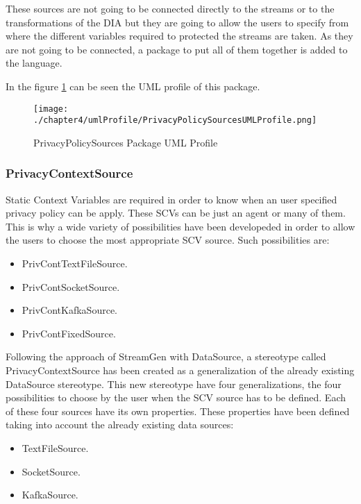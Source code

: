 These sources are not going to be connected directly to the streams or to the transformations of the DIA but they are going to allow the users to specify from where the different variables required to protected the streams are taken. As they are not going to be connected, a package to put all of them together is added to the language.

In the figure \ref{fig:PrivacyPolicySources Package UML Profile} can be seen the UML profile of this package.

\begin{figure}
\centering
{\texttt{[image: ./chapter4/umlProfile/PrivacyPolicySourcesUMLProfile.png]}}
\caption{PrivacyPolicySources Package UML Profile}
\label{fig:PrivacyPolicySources Package UML Profile}
\end{figure}


\subsubsection{PrivacyContextSource}

Static Context Variables are required in order to know when an user specified privacy policy can be apply. These SCVs can be just an agent or many of them. This is why a wide variety of possibilities have been developeded in order to allow the users to choose the most appropriate SCV source. Such possibilities are:

\begin{itemize}
\item PrivContTextFileSource.
\item PrivContSocketSource.
\item PrivContKafkaSource.
\item PrivContFixedSource.
\end{itemize}

Following the approach of StreamGen with DataSource, a stereotype called PrivacyContextSource has been created as a generalization of the already existing DataSource stereotype. This new stereotype have four generalizations, the four possibilities to choose by the user when the SCV source has to be defined. Each of these four sources have its own properties. These properties have been defined taking into account the already existing data sources:

\begin{itemize}
\item TextFileSource.
\item SocketSource.
\item KafkaSource.
\end{itemize}

